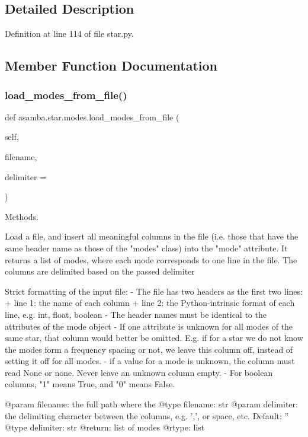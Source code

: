 \subsection{Detailed Description}


Definition at line 114 of file star.\+py.



\subsection{Member Function Documentation}
\mbox{\label{classasamba_1_1star_1_1modes_a5164b765f3ed46300e4c5a1970f2c784}} 
\subsubsection{\texorpdfstring{load\+\_\+modes\+\_\+from\+\_\+file()}{load\_modes\_from\_file()}}
{\footnotesize\ttfamily def asamba.\+star.\+modes.\+load\+\_\+modes\+\_\+from\+\_\+file (\begin{DoxyParamCaption}\item[{}]{self,  }\item[{}]{filename,  }\item[{}]{delimiter = {\ttfamily \textquotesingle{}\textquotesingle{}} }\end{DoxyParamCaption})}



Methods. 

\begin{DoxyVerb}Load a file, and insert all meaningful columns in the file (i.e. those that have the same header name
as those of the "modes" class) into the "mode" attribute. It returns a list of modes, where each mode
corresponds to one line in the file. The columns are delimited based on the passed delimiter

Strict formatting of the input file:
- The file has two headers as the first two lines:
  + line 1: the name of each column
  + line 2: the Python-intrinsic format of each line, e.g. int, float, boolean
- The header names must be identical to the attributes of the mode object
- If one attribute is unknown for all modes of the same star, that column would better be omitted.
  E.g. if for a star we do not know the modes form a frequency spacing or not, we leave this column
  off, instead of setting it off for all modes.
- if a value for a mode is unknown, the column must read None or none. Never leave an unknown column
  empty.
- For boolean columns, "1" means True, and "0" means False.

@param filename: the full path where the 
@type filename: str
@param delimiter: the delimiting character between the columns, e.g. ',', or space, etc. Default: ''
@type delimiter: str
@return: list of modes
@rtype: list
\end{DoxyVerb}
 

